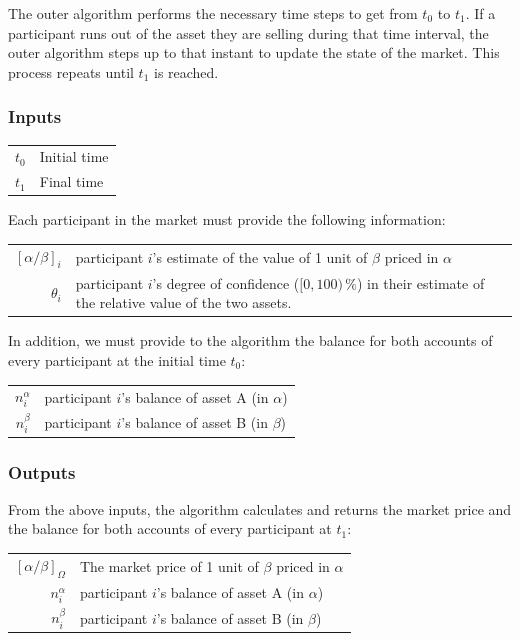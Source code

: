 \documentclass[letterpaper]{article}
\begin{document}
The outer algorithm performs the necessary time steps to get from $t_0$ to $t_1$. If a participant runs out of the asset they are selling during that time interval, the outer algorithm steps up to that instant to update the state of the market. This process repeats until $t_1$ is reached.

\subsubsection{Inputs}

\begin{tabularx}{\textwidth}{rX}
 $t_0$ & Initial time \\
$t_1$ & Final time
\end{tabularx}

Each participant in the market must provide the following information:

\begin{tabularx}{\textwidth}{rX}
 $[\alpha/\beta]_i$ & participant $i$'s estimate of the value of 1 unit of $\beta$ priced in $\alpha$ \\
$\theta_i$ & participant $i$'s degree of confidence ($[0,100)\,\%$) in their estimate of the relative value of the two assets.
\end{tabularx}

In addition, we must provide to the algorithm the balance for both accounts of every participant at the initial time $t_0$:

\begin{tabularx}{\textwidth}{rX}
 $n_i^\alpha$ & participant $i$'s balance of asset A (in $\alpha$) \\
$n_i^\beta$ & participant $i$'s balance of asset B (in $\beta$)
\end{tabularx}

\subsubsection{Outputs}
From the above inputs, the algorithm calculates and returns the market price and the balance for both accounts of every participant at $t_1$:

\begin{tabularx}{\textwidth}{rX}
 $[\alpha/\beta]_\Omega$ & The market price of 1 unit of $\beta$ priced in $\alpha$ \\
 $n_i^\alpha$ & participant $i$'s balance of asset A (in $\alpha$) \\
$n_i^\beta$ & participant $i$'s balance of asset B (in $\beta$)
\end{tabularx}
\end{document}

